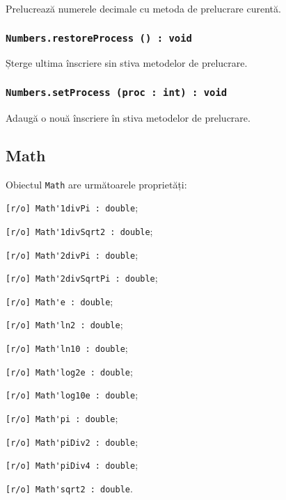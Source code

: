 Prelucrează numerele decimale cu metoda de prelucrare curentă.

\subsubsection{\lstinline|Numbers.restoreProcess () : void|}

Șterge ultima înscriere sin stiva metodelor de prelucrare.

\subsubsection{\lstinline|Numbers.setProcess (proc : int) : void|}

Adaugă o nouă înscriere în stiva metodelor de prelucrare.

\subsection{{\color{orange} Math}}

Obiectul \lstinline|Math| are următoarele proprietăți:
\begin{icItems}
	\item \lstinline|[r/o] Math'1divPi : double|;
	\item \lstinline|[r/o] Math'1divSqrt2 : double|;
	\item \lstinline|[r/o] Math'2divPi : double|;
	\item \lstinline|[r/o] Math'2divSqrtPi : double|;
	\item \lstinline|[r/o] Math'e : double|;
	\item \lstinline|[r/o] Math'ln2 : double|;
	\item \lstinline|[r/o] Math'ln10 : double|;
	\item \lstinline|[r/o] Math'log2e : double|;
	\item \lstinline|[r/o] Math'log10e : double|;
	\item \lstinline|[r/o] Math'pi : double|;
	\item \lstinline|[r/o] Math'piDiv2 : double|;
	\item \lstinline|[r/o] Math'piDiv4 : double|;
	\item \lstinline|[r/o] Math'sqrt2 : double|.
\end{icItems}

